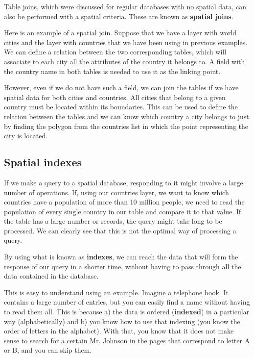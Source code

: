 Table joins, which were discussed for regular databases with no spatial data, can also be performed with a spatial criteria. These are known as \textbf{spatial joins}.

Here is an example of a spatial join. Suppose that we have a layer with world cities and the layer with countries that we have been using in previous examples. We can define a relation between the two corresponding tables, which will associate to each city all the attributes of the country it belongs to. A field with the country name in both tables is needed to use it as the linking point. 

However, even if we do not have such a field, we can join the tables if we have spatial data for both cities and countries. All cities that belong to a given country must be located within its boundaries. This can be used to define the relation between the tables and we can know which country a city belongs to just by finding the polygon from the countries list in which the point representing the city is located.


\subsection{Spatial indexes}

If we make a query to a spatial database, responding to it might involve a large number of operations. If, using our countries layer, we want to know which countries have a population of more than 10 million people, we need to read the population of every single country in our table and compare it to that value. If the table has a large number or records, the query might take long to be processed. We can clearly see that this is not the optimal way of processing a query.

By using what is known as \textbf{indexes}, we can reach the data that will form the response of our query in a shorter time, without having to pass through all the data contained in the database.

This is easy to understand using an example. Imagine a telephone book. It contains a large number of entries, but you can easily find a name without having to read them all. This is because a) the data is ordered (\textbf{indexed}) in a particular way (alphabetically) and b) you know how to use that indexing (you know the order of letters in the alphabet). With that, you know that it does not make sense to search for a certain Mr. Johnson in the pages that correspond to letter A or B, and you can skip them.  

